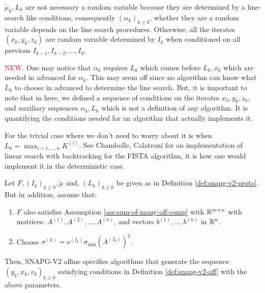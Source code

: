 \documentclass[12pt]{article}
\begin{document}
    \begin{remark}
        $\tilde \mu_k, L_k$ are not necessary a random variable because they are determined by a line-search like conditions, consequently $(\alpha_k)_{k\ge 0}$, whether they are a random variable depends on the line search procedures. 
        Otherwise, all the iterates $(x_k, y_k, z_k)$ are random variable determined by $I_k$ when conditioned on all previous $I_{k - 1}, I_{k - 2}, \ldots, I_{0}$. 
        \par
        \textcolor{red}{NEW}. One may notice that $\alpha_k$ requires $L_k$ which comes before $L_k, x_k$ which are needed in advanced for $\alpha_k$. 
        This may seem off since no algorithm can know what $L_k$ to choose in advanced to determine the line search. 
        But, it is important to note that in here, we defined a sequence of conditions on the iterates $x_k, y_k, z_k$, and auxiliary sequences $\alpha_k, L_k$ which is not a definition of any algorithm. 
        It is quantifying the conditions needed for an algorithm that actually implements it.
        \par
        For the trivial case where we don't need to worry about it is when $L_k = \max_{i = 1, \ldots, n} K^{(i)}$. 
        See Chambolle, Calatroni \cite{calatroni_backtracking_2019} for an implementation of linear search with backtracking for the FISTA algorithm, it is how one would implement it in the deterministic case. 
    \end{remark}
    \begin{definition}\label{def:snapg-v2-aff}
        Let $F, (I_k)_{k \ge 0}, \tilde \mu$ and, $(L_k)_{k \ge 0}$ be given as in Definition \ref{def:snapg-v2-proto}. 
        But in addition, assume that: 
        \begin{enumerate}[nosep]
            \item $F$ also satisfies Assumption \ref{ass:sum-of-many-aff-comp} with $\mathbb R^{m \times n}$ with matrices: $A^{(1)}, A^{(2)}, \ldots, A^{(n)}$, and vectors $b^{(1)}, \ldots, b^{(n)}$ in $\mathbb R^n$.  
            \item Choose $\sigma^{(k)} = \nu^{(I_k)}\sigma_{\min}(A^{(I_k)})^2$. 
        \end{enumerate}
        Then, SNAPG-V2 affine specifies algorithms that generate the sequence $(y_k, x_k, v_k)_{k \ge 0}$ satisfying conditions in Definition \ref{def:snapg-v2-aff} with the above parameters. 
    \end{definition}
\end{document}
